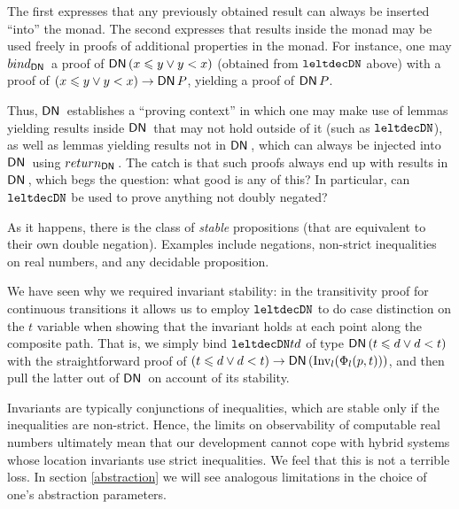 \documentclass[runningheads]{llncs}
\renewcommand{\leq}{\leqslant}
\newcommand{\DN}{{\sf DN}\,}
\newcommand{\State}{{\rm State}}
\newcommand{\Inv}{{\rm Inv}}
\newcommand{\Unsafe}{{\rm Unsafe}}
\newcommand{\Reach}{{\rm Reach}}
\newcommand{\leltdecDN}{{\tt leltdecDN}}
\begin{document}
The first expresses that any previously obtained result can always be
inserted ``into'' the monad. The second expresses that results inside
the monad may be used freely in proofs of additional properties in the
monad. For instance, one may $bind_{\DN}$ a proof of $\DN (x \leq y \vee y < x)$ 
(obtained from $\leltdecDN$ above) with a proof of $(x \leq y \vee y < x) \rightarrow \DN P$, yielding a proof of $\DN P$.
 
Thus, $\DN$ establishes a ``proving context'' in which one may make
use of lemmas yielding results inside $\DN$ that may not hold outside
of it (such as $\leltdecDN$), as well as lemmas yielding results
not in $\DN$, which can always be injected into $\DN$ using
$return_{\DN}$. The catch is that such proofs always end up with results
in $\DN$, which begs the question: what good is any of this? In
particular, can $\leltdecDN$ be used to prove anything not doubly
negated?
 
As it happens, there is the class of \emph{stable} propositions (that
are equivalent to their own double negation). Examples include
negations, non-strict inequalities on real numbers, and any decidable
proposition.
 
We have seen why we required invariant stability:
in the transitivity proof for continuous transitions
it allows
us to employ $\leltdecDN$ to do case distinction on the $t$ variable
when showing that the invariant holds at each point along the
composite path. That is, we simply bind $\leltdecDN t d$ of type
$\DN (t \leq d \vee d < t)$ with the straightforward proof of $(t \leq d
\vee d < t) \rightarrow \DN (\Inv_l(\Phi_l (p, t)))$, and
then pull the latter out of $\DN$ on account of its stability.
 
Invariants are typically conjunctions of inequalities, which are
stable only if the inequalities are non-strict. Hence, the limits on
observability of computable real numbers ultimately mean that our
development cannot cope with hybrid systems whose location invariants
use strict inequalities. We feel that this is not a terrible loss. In
section \ref{abstraction} we will see analogous limitations in the
choice of one's abstraction parameters.
 
\end{document}
